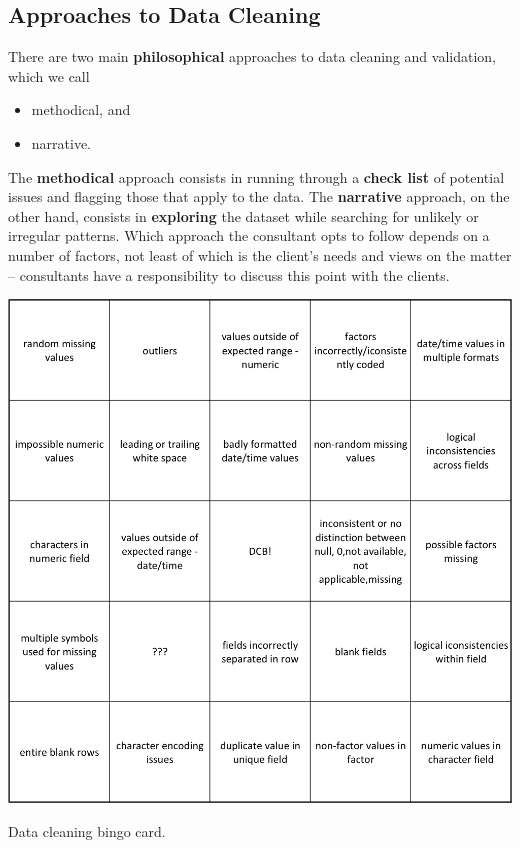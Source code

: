 \subsection{Approaches to Data Cleaning}
There are two main \textbf{philosophical} approaches to data cleaning and validation, which we call
\begin{itemize}[noitemsep]
\item methodical, and 
\item narrative.
\end{itemize}
The \textbf{methodical} approach consists in running through a \textbf{check list} of potential issues and flagging those that apply to the data.
The \textbf{narrative} approach, on the other hand, consists in \textbf{exploring} the dataset while searching for unlikely or irregular patterns. Which approach the consultant opts to follow depends on a number of factors, not least of which is the client's needs and views  on the matter -- consultants have a responsibility to discuss this point with the clients.
\begin{table}[t]
\centering
\includegraphics[width=\textwidth]{Images/bingo.png}
\caption{\small Data cleaning bingo card.} \label{fig:bingo}
\end{table}
